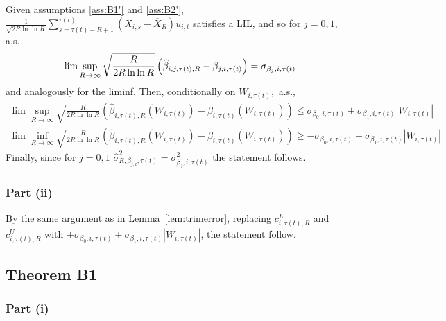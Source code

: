 Given assumptions \ref{ass:B1'} and \ref{ass:B2'}, $\frac{1}{\sqrt{2R\ln \ln R}}%
\sum_{s=\tau(t)-R+1}^{\tau(t)}\left( X_{i,s}-\overline{X}_{R}\right) u_{i,t}$ satisfies a
LIL, and so for $j=0,1,$ a.s.%
\begin{align*}
\lim \sup_{R\rightarrow \infty }\sqrt{\frac{R}{2R\ln \ln R}}\left( \widehat{%
\beta }_{i,j,\tau(t),R}-\beta _{j,i,\tau(t)}\right) =\sigma _{\beta _{j},i,\tau(t)}
\end{align*}%
and analogously for the liminf. Then, conditionally on $W_{i,\tau(t)},$ a.s.,%
\begin{align*}
\lim \sup_{R\rightarrow \infty }\sqrt{\frac{R}{2R\ln \ln R}}\left( \widehat{\beta }_{i,\tau(t),R}\left( W_{i,\tau(t)}\right) -\beta_{i,\tau(t)}\left( W_{i,\tau(t)}\right) \right) \leq \sigma_{\beta_{0},i,\tau(t)}+\sigma_{\beta_{1},i,\tau(t)}\left\vert W_{i,\tau(t)}\right\vert
\end{align*}%
\begin{align*}
\lim \inf_{R\rightarrow \infty }\sqrt{\frac{R}{2R\ln \ln R}}\left( \widehat{\beta }_{i,\tau(t),R}\left(
W_{i,\tau(t)}\right) -\beta _{i,\tau(t)}\left( W_{i,\tau(t)}\right)\right) \geq -\sigma _{\beta _{0},i,\tau(t)}-\sigma_{\beta _{1},i,\tau(t)}\left\vert W_{i,\tau(t)}\right\vert
\end{align*}%
Finally, since for $j=0,1$ $\widehat{\sigma }_{R,\beta _{j,i},\tau(t)}^{2}=\sigma _{\beta _{j},i,\tau(t)}^{2}$ the statement follows.

\subsubsection{Part (ii)}

By the same argument as in Lemma~\ref{lem:trimerror}, replacing $c_{i,\tau(t),R}^{L}$ and $c_{i,\tau(t),R}^{U}$ with $\pm
\sigma _{\beta _{0},i,\tau(t)}\pm \sigma _{\beta
_{1},i,\tau(t)}\left\vert W_{i,\tau(t)}\right\vert$, the statement follow.


\subsection{Theorem B1}

\subsubsection{Part (i)}

